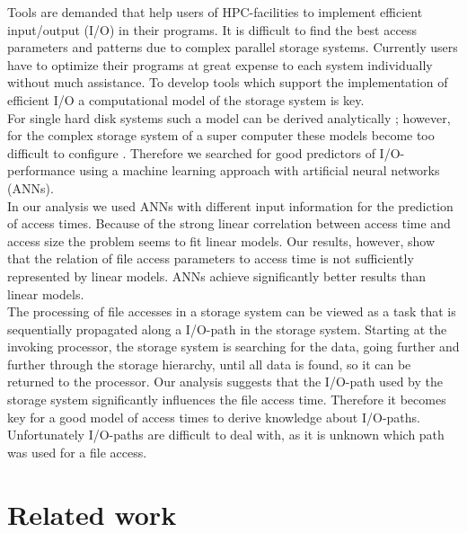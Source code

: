 \documentclass{superfri}
\begin{document}
Tools are demanded that help users of HPC-facilities to implement efficient input/output (I/O) in their programs.
It is difficult to find the best access parameters and patterns due to complex parallel storage systems.
Currently users have to optimize their programs at great expense to each system individually without much assistance.
To develop tools which support the implementation of efficient I/O a computational model of the storage system is key.\\
For single hard disk systems such a model can be derived analytically \cite{Ruemmler94anintroduction}; however, for the complex storage system of a super computer these models become too difficult to configure \cite{DBLP:conf/npc/ZhangLZJC10}.
Therefore we searched for good predictors of I/O-performance using a machine learning approach with artificial neural networks (ANNs).\\
In our analysis we used ANNs with different input information for the prediction of access times.
Because of the strong linear correlation between access time and access size the problem seems to fit linear models.
Our results, however, show that the relation of file access parameters to access time is not sufficiently represented by linear models.
ANNs achieve significantly better results than linear models.\\
The processing of file accesses in a storage system can be viewed as a task that is sequentially propagated along a I/O-path in the storage system.
Starting at the invoking processor, the storage system is searching for the data, going further and further through the storage hierarchy, until all data is found, so it can be returned to the processor.
Our analysis suggests that the I/O-path used by the storage system significantly influences the file access time.
Therefore it becomes key for a good model of access times to derive knowledge about I/O-paths.
Unfortunately I/O-paths are difficult to deal with, as it is unknown which path was used for a file access.

\section{Related work}
\label{sec:related}
\end{document}
